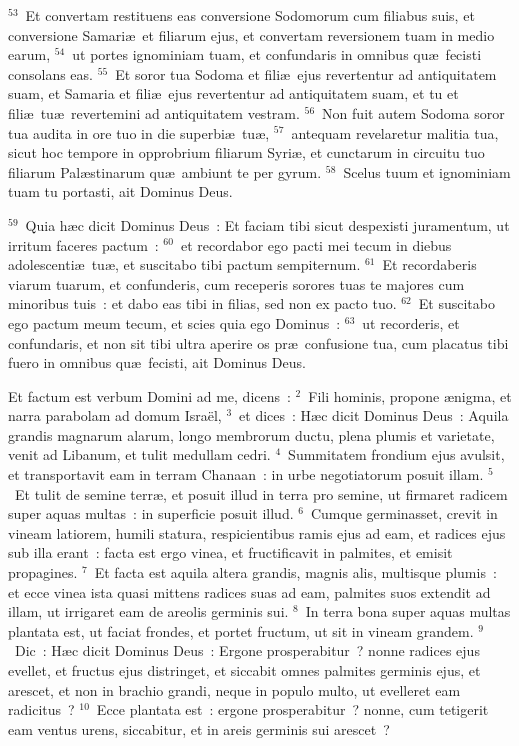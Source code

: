 ${}^{53}$~Et convertam restituens eas conversione Sodomorum cum filiabus suis, et conversione Samari\ae\ et filiarum ejus, et convertam reversionem tuam in medio earum,
${}^{54}$~ut portes ignominiam tuam, et confundaris in omnibus qu\ae\ fecisti consolans eas.
${}^{55}$~Et soror tua Sodoma et fili\ae\ ejus revertentur ad antiquitatem suam, et Samaria et fili\ae\ ejus revertentur ad antiquitatem suam, et tu et fili\ae\ tu\ae\ revertemini ad antiquitatem vestram.
${}^{56}$~Non fuit autem Sodoma soror tua audita in ore tuo in die superbi\ae\ tu\ae ,
${}^{57}$~antequam revelaretur malitia tua, sicut hoc tempore in opprobrium filiarum Syri\ae , et cunctarum in circuitu tuo filiarum Pal\ae stinarum qu\ae\ ambiunt te per gyrum.
${}^{58}$~Scelus tuum et ignominiam tuam tu portasti, ait Dominus Deus.


${}^{59}$~Quia h\ae c dicit Dominus Deus~: Et faciam tibi sicut despexisti juramentum, ut irritum faceres pactum~:
${}^{60}$~et recordabor ego pacti mei tecum in diebus adolescenti\ae\ tu\ae , et suscitabo tibi pactum sempiternum.
${}^{61}$~Et recordaberis viarum tuarum, et confunderis, cum receperis sorores tuas te majores cum minoribus tuis~: et dabo eas tibi in filias, sed non ex pacto tuo.
${}^{62}$~Et suscitabo ego pactum meum tecum, et scies quia ego Dominus~:
${}^{63}$~ut recorderis, et confundaris, et non sit tibi ultra aperire os pr\ae\ confusione tua, cum placatus tibi fuero in omnibus qu\ae\ fecisti, ait Dominus Deus.

\bchapter
\lettrine[lines=3,image=true,loversize=0.05,lraise=-0.03]{E}{}t factum est verbum Domini ad me, dicens~:
${}^{2}$~Fili hominis, propone \ae nigma, et narra parabolam ad domum Isra\"el,
${}^{3}$~et dices~: H\ae c dicit Dominus Deus~: Aquila grandis magnarum alarum, longo membrorum ductu, plena plumis et varietate, venit ad Libanum, et tulit medullam cedri.
${}^{4}$~Summitatem frondium ejus avulsit, et transportavit eam in terram Chanaan~: in urbe negotiatorum posuit illam.
${}^{5}$~Et tulit de semine terr\ae , et posuit illud in terra pro semine, ut firmaret radicem super aquas multas~: in superficie posuit illud.
${}^{6}$~Cumque germinasset, crevit in vineam latiorem, humili statura, respicientibus ramis ejus ad eam, et radices ejus sub illa erant~: facta est ergo vinea, et fructificavit in palmites, et emisit propagines.
${}^{7}$~Et facta est aquila altera grandis, magnis alis, multisque plumis~: et ecce vinea ista quasi mittens radices suas ad eam, palmites suos extendit ad illam, ut irrigaret eam de areolis germinis sui.
${}^{8}$~In terra bona super aquas multas plantata est, ut faciat frondes, et portet fructum, ut sit in vineam grandem.
${}^{9}$~Dic~: H\ae c dicit Dominus Deus~: Ergone prosperabitur~? nonne radices ejus evellet, et fructus ejus distringet, et siccabit omnes palmites germinis ejus, et arescet, et non in brachio grandi, neque in populo multo, ut evelleret eam radicitus~?
${}^{10}$~Ecce plantata est~: ergone prosperabitur~? nonne, cum tetigerit eam ventus urens, siccabitur, et in areis germinis sui arescet~?


